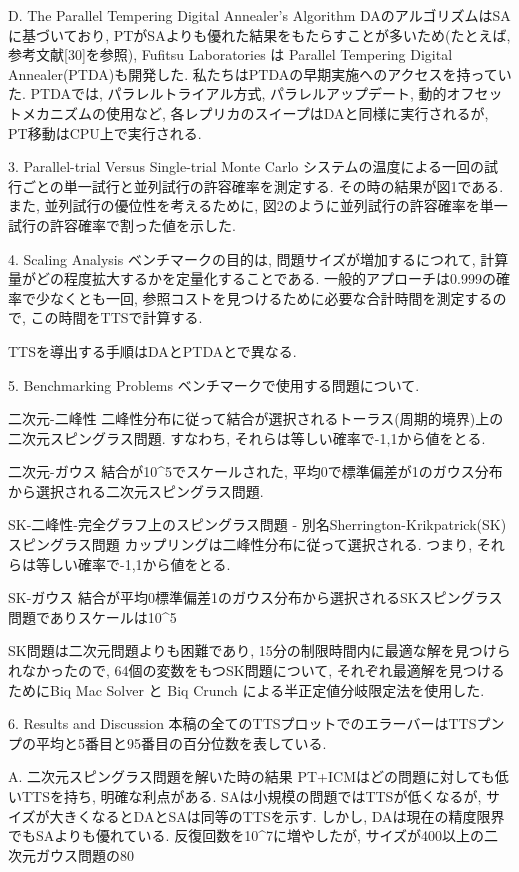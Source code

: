 D. The Parallel Tempering Digital Annealer's Algorithm
DAのアルゴリズムはSAに基づいており, PTがSAよりも優れた結果をもたらすことが多いため(たとえば, 参考文献[30]を参照), Fufitsu Laboratories は Parallel Tempering Digital Annealer(PTDA)も開発した. 
私たちはPTDAの早期実施へのアクセスを持っていた. 
PTDAでは, パラレルトライアル方式, パラレルアップデート, 動的オフセットメカニズムの使用など, 各レプリカのスイープはDAと同様に実行されるが, PT移動はCPU上で実行される. 


3. Parallel-trial Versus Single-trial Monte Carlo
システムの温度による一回の試行ごとの単一試行と並列試行の許容確率を測定する. 
その時の結果が図1である. 
また, 並列試行の優位性を考えるために, 図2のように並列試行の許容確率を単一試行の許容確率で割った値を示した. 

4. Scaling Analysis
ベンチマークの目的は, 問題サイズが増加するにつれて, 計算量がどの程度拡大するかを定量化することである. 
一般的アプローチは0.999の確率で少なくとも一回, 参照コストを見つけるために必要な合計時間を測定するので, この時間をTTSで計算する. 

TTSを導出する手順はDAとPTDAとで異なる. 

5. Benchmarking Problems
ベンチマークで使用する問題について. 

二次元-二峰性
  二峰性分布に従って結合が選択されるトーラス(周期的境界)上の二次元スピングラス問題. すなわち, それらは等しい確率で{-1,1}から値をとる. 
  
二次元-ガウス
  結合が10^5でスケールされた, 平均0で標準偏差が1のガウス分布から選択される二次元スピングラス問題. 
  
SK-二峰性-完全グラフ上のスピングラス問題 - 別名Sherrington-Krikpatrick(SK)スピングラス問題
  カップリングは二峰性分布に従って選択される. つまり, それらは等しい確率で{-1,1}から値をとる. 
  
SK-ガウス
  結合が平均0標準偏差1のガウス分布から選択されるSKスピングラス問題でありスケールは10^5

SK問題は二次元問題よりも困難であり, 15分の制限時間内に最適な解を見つけられなかったので, 64個の変数をもつSK問題について, それぞれ最適解を見つけるためにBiq Mac Solver と Biq Crunch による半正定値分岐限定法を使用した. 

6. Results and Discussion
本稿の全てのTTSプロットでのエラーバーはTTSプンプの平均と5番目と95番目の百分位数を表している. 

A. 二次元スピングラス問題を解いた時の結果
PT+ICMはどの問題に対しても低いTTSを持ち, 明確な利点がある. 
SAは小規模の問題ではTTSが低くなるが, サイズが大きくなるとDAとSAは同等のTTSを示す. 
しかし, DAは現在の精度限界でもSAよりも優れている. 
反復回数を10^7に増やしたが, サイズが400以上の二次元ガウス問題の80%

